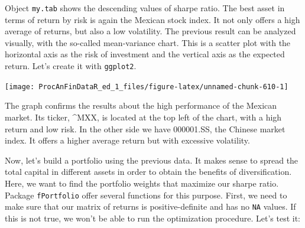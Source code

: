 \documentclass[11pt,]{book}
\newenvironment{Shaded}{\begin{snugshade}}{\end{snugshade}}
\newcommand{\KeywordTok}[1]{\textcolor[rgb]{0.27,0.27,0.27}{\textbf{#1}}}
\newcommand{\DataTypeTok}[1]{\textcolor[rgb]{0.27,0.27,0.27}{#1}}
\newcommand{\DecValTok}[1]{\textcolor[rgb]{0.06,0.06,0.06}{#1}}
\newcommand{\FloatTok}[1]{\textcolor[rgb]{0.06,0.06,0.06}{#1}}
\newcommand{\StringTok}[1]{\textcolor[rgb]{0.5,0.5,0.5}{#1}}
\newcommand{\OperatorTok}[1]{\textcolor[rgb]{0.81,0.36,0.00}{\textbf{#1}}}
\newcommand{\NormalTok}[1]{#1}
\begin{document}
Object \texttt{my.tab} shows the descending values of sharpe ratio. The
best asset in terms of return by risk is again the Mexican stock index.
It not only offers a high average of returns, but also a low volatility.
The previous result can be analyzed visually, with the so-called
mean-variance chart. This is a scatter plot with the horizontal axis as
the risk of investment and the vertical axis as the expected return.
Let's create it with \texttt{ggplot2}.

\begin{Shaded}
\end{Shaded}

\begin{center}\texttt{[image: ProcAnFinDataR\_ed\_1\_files/figure-latex/unnamed-chunk-610-1]} \end{center}

The graph confirms the results about the high performance of the Mexican
market. Its ticker, \^{}MXX, is located at the top left of the chart,
with a high return and low risk. In the other side we have 000001.SS,
the Chinese market index. It offers a higher average return but with
excessive volatility.

Now, let's build a portfolio using the previous data. It makes sense to
spread the total capital in different assets in order to obtain the
benefits of diversification. Here, we want to find the portfolio weights
that maximize our sharpe ratio. Package \texttt{fPortfolio} offer
several functions for this purpose. First, we need to make sure that our
matrix of returns is positive-definite and has no \texttt{NA} values. If
this is not true, we won't be able to run the optimization procedure.
Let's test it:
\end{document}
